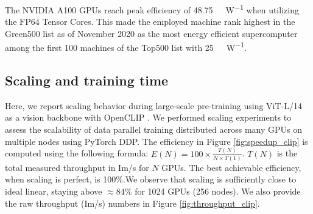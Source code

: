 \begin{appendix}
The NVIDIA A100 GPUs reach peak efficiency of \SI{48,75}{\giga\floppersec\per\watt} when utilizing the $\text{FP64}$ Tensor Cores. This made the employed machine rank highest in the Green500 list as of November 2020 as the most energy efficient supercomputer among the first 100 machines of the Top500 list with \SI{25}{\giga\floppersec\per\watt}.



\subsection{Scaling and training time}
\label{appendix:scaling}

Here, we report scaling behavior during large-scale pre-training  using ViT-L/14 as a vision backbone with OpenCLIP \citep{ilharco_gabriel_2021_5143773}.
We performed scaling experiments to assess the scalability of data parallel training distributed across many GPUs on multiple nodes using PyTorch DDP.
The efficiency in Figure \ref{fig:speedup_clip} is computed using the following formula: $E(N) = 100 \times \frac{T(N)}{N \times T(1)}$. $T(N)$ is the total measured throughput in Im/s for $N$ GPUs. The best achievable efficiency, when scaling is perfect, is 100\%.We observe that scaling is sufficiently close to ideal linear, staying above $\approx 84\%$ for 1024 GPUs (256 nodes).
We also provide the raw throughput (Im/s) numbers in Figure \ref{fig:throughput_clip}. 
    

\end{appendix}
